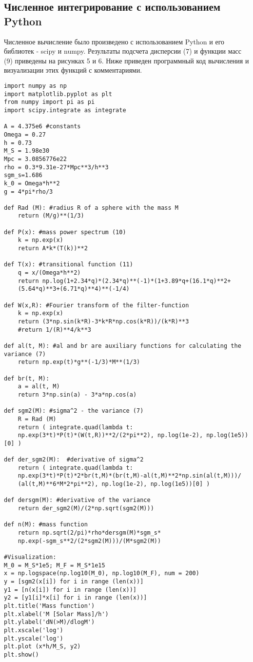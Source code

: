 \documentclass[11pt]{article}
\begin{document}
\subsection{Численное интегрирование с использованием Python}
Численное вычисление было произведено с использованием Python и его библиотек - scipy и numpy. Результаты подсчета дисперсии (7) и функции масс (9) приведены  на рисунках 5 и 6. Ниже приведен программный код вычисления и визуализации этих функций с комментариями.

\lstset{language=Python}
\begin{lstlisting}
import numpy as np
import matplotlib.pyplot as plt
from numpy import pi as pi
import scipy.integrate as integrate

A = 4.375e6 #constants
Omega = 0.27
h = 0.73
M_S = 1.98e30
Mpc = 3.0856776e22
rho = 0.3*9.31e-27*Mpc**3/h**3
sgm_s=1.686
k_0 = Omega*h**2
g = 4*pi*rho/3

def Rad (M): #radius R of a sphere with the mass M
    return (M/g)**(1/3)     
    
def P(x): #mass power spectrum (10)
    k = np.exp(x)
    return A*k*(T(k))**2
            
def T(x): #transitional function (11)
    q = x/(Omega*h**2)
    return np.log(1+2.34*q)*(2.34*q)**(-1)*(1+3.89*q+(16.1*q)**2+
    (5.64*q)**3+(6.71*q)**4)**(-1/4)

def W(x,R): #Fourier transform of the filter-function   
    k = np.exp(x)
    return (3*np.sin(k*R)-3*k*R*np.cos(k*R))/(k*R)**3
    #return 1/(R)**4/k**3    

def al(t, M): #al and br are auxiliary functions for calculating the variance (7)
    return np.exp(t)*g**(-1/3)*M**(1/3)
    
def br(t, M):
    a = al(t, M)
    return 3*np.sin(a) - 3*a*np.cos(a)
    
def sgm2(M): #sigma^2 - the variance (7)
    R = Rad (M)   
    return ( integrate.quad(lambda t:
    np.exp(3*t)*P(t)*(W(t,R))**2/(2*pi**2), np.log(1e-2), np.log(1e5))[0] )  

def der_sgm2(M):  #derivative of sigma^2      
    return ( integrate.quad(lambda t:
    np.exp(3*t)*P(t)*2*br(t,M)*(br(t,M)-al(t,M)**2*np.sin(al(t,M)))/
    (al(t,M)**6*M*2*pi**2), np.log(1e-2), np.log(1e5))[0] )

def dersgm(M): #derivative of the variance 
    return der_sgm2(M)/(2*np.sqrt(sgm2(M)))

def n(M): #mass function
    return np.sqrt(2/pi)*rho*dersgm(M)*sgm_s*
    np.exp(-sgm_s**2/(2*sgm2(M)))/(M*sgm2(M))

#Visualization:    
M_0 = M_S*1e5; M_F = M_S*1e15
x = np.logspace(np.log10(M_0), np.log10(M_F), num = 200) 
y = [sgm2(x[i]) for i in range (len(x))]
y1 = [n(x[i]) for i in range (len(x))]
y2 = [y1[i]*x[i] for i in range (len(x))]
plt.title('Mass function')
plt.xlabel('M [Solar Mass]/h')
plt.ylabel('dN(>M)/dlogM')
plt.xscale('log')
plt.yscale('log')
plt.plot (x*h/M_S, y2)
plt.show()
\end{lstlisting}
\end{document}
